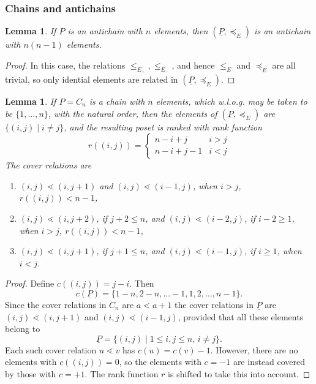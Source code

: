 \documentclass[11pt,a4paper,abstract=yes]{scrartcl}
\theoremstyle{plain}
\newtheorem{lemma}[theorem]{Lemma}
\newcommand{\arel}{\le_{E_+}}
\newcommand{\brel}{\le_{E_-}}
\newcommand{\erel}{\le_{E}}
\newcommand{\transerel}{\preceq_{E}}
\newcommand{\Pairs}[1]{\underline{#1}}
\newcommand{\Ppairs}{\Pairs{P}}
\begin{document}
\subsubsection{Chains and antichains}
\label{sec:org472a157}
\begin{lemma}
If \(P\) is an antichain with \(n\) elements, then \((\Ppairs, \transerel)\)
is an antichain with \(n(n-1)\) elements.
\end{lemma}
\begin{proof}
In this case, the relations \(\arel,\brel\), and hence \(\erel\) and \(\transerel\) are all trivial,
so only idential elements are related in \((\Ppairs, \transerel)\).
\end{proof}

\begin{lemma}
If \(P=C_{n}\) is a chain with \(n\) elements, which w.l.o.g. may be taken to be \(\{1,\dots,n\}\),
with the natural order, then the elements of \((\Ppairs, \transerel)\)
are \(\{(i,j) \mid i \neq j\}\), and
the resulting poset is ranked with rank function
\begin{equation*}
r((i,j)) =
\begin{cases}
  n - i + j  & i > j \\
  n - i + j - 1 & i < j
\end{cases}
\end{equation*}
The cover relations are
\begin{enumerate}
\item \((i,j) \lessdot (i,j+1)\) and \((i,j) \lessdot (i-1,j)\), when \(i > j\), \(r((i,j)) < n - 1\),
\item \((i,j) \lessdot (i,j+2)\), if \(j+2 \le n\), and \((i,j) \lessdot (i-2,j)\), if \(i-2 \ge 1\),
when \(i > j\), \(r((i,j)) < n - 1\),
\item \((i,j) \lessdot (i,j+1)\), if \(j+1 \le n\), and \((i,j) \lessdot (i-1,j)\), if \(i \ge 1\), when \(i < j\).
\end{enumerate}
\end{lemma}
\begin{proof}
Define \(c((i,j)) = j - i\). Then
\[c(\Ppairs)=\{1-n, 2-n, \dots - 1, 1,2, \dots, n-1\}.\]
Since the cover relations in \(C_{n}\) are \(a \lessdot a+1\)
the cover relations in \(\Ppairs\) are \((i,j) \lessdot (i,j+1)\)
and \((i,j) \lessdot (i-1,j)\), provided that all these elements belong to
\[\Ppairs = \{(i,j) \mid 1 \le i,j \le n, \, i \neq j\}.\]
Each such cover relation \(u \lessdot v\) has \(c(u) = c(v)-1\).
However, there are no elements with \(c((i,j))=0\), so the elements with
\(c=-1\) are instead covered by those with \(c=+1\). The rank function \(r\) is shifted to take this
into account.
\end{proof}
\end{document}
